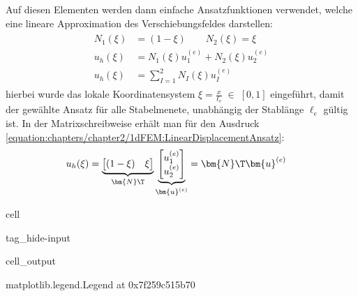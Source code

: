 \documentclass[letterpaper,10pt,german]{jupyterBook}
\begin{document}
\sphinxAtStartPar
Auf diesen Elementen werden dann einfache Ansatzfunktionen verwendet, welche eine lineare Approximation des Verschiebungsfeldes darstellen:
\begin{equation}\label{equation:chapters/chapter2/1dFEM:LinearDisplacementAnsatz}
\begin{split}\begin{align}
 N_1(\xi) & = (1-\xi) \qquad N_2(\xi)= \xi  \\
 u_h(\xi) & = N_1(\xi) u_1^{(e)}+ N_2(\xi) u_2^{(e)} \\
 u_h(\xi) & = \sum_{I=1}^2 N_I(\xi) u_I^{(e)}
 \end{align}\end{split}
\end{equation}
\sphinxAtStartPar
hierbei wurde das lokale Koordinatensystem \(\xi = \frac{x}{\ell_e} \; \in \; [0,1]\)  eingeführt, damit der gewählte Ansatz für alle Stabelmenete, unabhängig der Stablänge \(\ell_e\) gültig ist. In der Matrixschreibweise erhält man für den Ausdruck \eqref{equation:chapters/chapter2/1dFEM:LinearDisplacementAnsatz}:
\begin{equation}\label{equation:chapters/chapter2/1dFEM:LinearDisplacementAnsatz2}
\begin{split}\begin{align}
  u_h(\xi) & = \underbrace{\begin{bmatrix} (1-\xi) & \xi \end{bmatrix}}_{\bm{N}\T} \underbrace{\begin{bmatrix} u_1^{(e)} \\ u_2^{(e)}\end{bmatrix}}_{\bm{u}^{(e)}} = \bm{N}\T \bm{u}^{(e)}
 \end{align}\end{split}
\end{equation}
\begin{sphinxuseclass}{cell}
\begin{sphinxuseclass}{tag_hide-input}\begin{sphinxVerbatimOutput}

\begin{sphinxuseclass}{cell_output}
\begin{sphinxVerbatim}[commandchars=\\\{\}]
\PYGZlt{}matplotlib.legend.Legend at 0x7f259c515b70\PYGZgt{}
\end{sphinxVerbatim}

\noindent{}

\end{sphinxuseclass}\end{sphinxVerbatimOutput}

\end{sphinxuseclass}
\end{sphinxuseclass}
\end{document}
